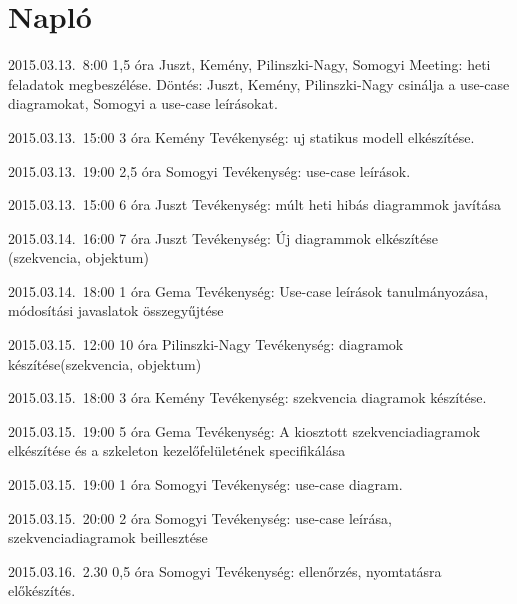 %
\section{Napló}

\begin{naplo}

\bejegyzes
{2015.03.13.~8:00} %
{1,5 óra} %
{Juszt, Kemény, Pilinszki-Nagy, Somogyi} %
{Meeting: heti feladatok megbeszélése. Döntés: Juszt, Kemény, Pilinszki-Nagy csinálja a use-case diagramokat, Somogyi a use-case leírásokat.} %

\bejegyzes
{2015.03.13.~15:00} %
{3 óra} %
{Kemény} %
{Tevékenység: uj statikus modell elkészítése.} %

\bejegyzes
{2015.03.13.~19:00} %
{2,5 óra} %
{Somogyi} %
{Tevékenység: use-case leírások.} %

\bejegyzes
{2015.03.13.~15:00} %
{6 óra} %
{Juszt} %
{Tevékenység: múlt heti hibás diagrammok javítása} %

\bejegyzes
{2015.03.14.~16:00} %
{7 óra} %
{Juszt} %
{Tevékenység: Új diagrammok elkészítése (szekvencia, objektum)} %

\bejegyzes
{2015.03.14.~18:00}
{1 óra}
{Gema}
{Tevékenység: Use-case leírások tanulmányozása, módosítási javaslatok összegyűjtése}

\bejegyzes
{2015.03.15.~12:00} %
{10 óra} %
{Pilinszki-Nagy} %
{Tevékenység: diagramok készítése(szekvencia, objektum)} %

\bejegyzes
{2015.03.15.~18:00} %
{3 óra} %
{Kemény} %
{Tevékenység: szekvencia diagramok készítése.} %

\bejegyzes
{2015.03.15.~19:00}
{5 óra}
{Gema}
{Tevékenység: A kiosztott szekvenciadiagramok elkészítése és a szkeleton kezelőfelületének specifikálása}

\bejegyzes
{2015.03.15.~19:00} %
{1 óra} %
{Somogyi} %
{Tevékenység: use-case diagram.} %

\bejegyzes
{2015.03.15.~20:00} %
{2 óra} %
{Somogyi} %
{Tevékenység: use-case leírása, szekvenciadiagramok beillesztése} %

\bejegyzes
{2015.03.16.~2.30} %
{0,5 óra} %
{Somogyi} %
{Tevékenység: ellenőrzés, nyomtatásra előkészítés.} %



\end{naplo}

